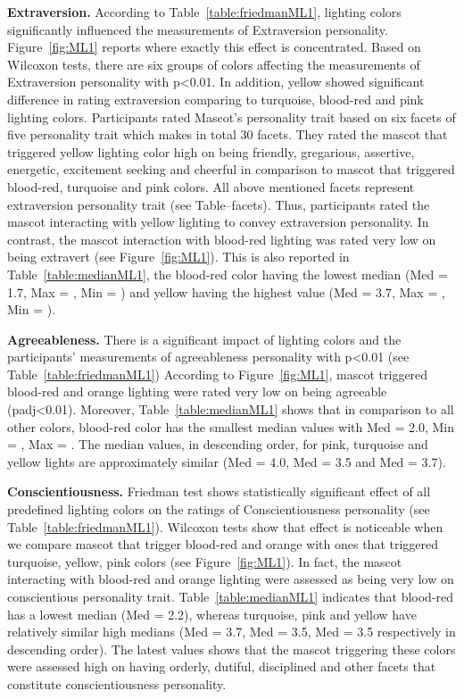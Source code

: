 \par\textbf{Extraversion.}
According to Table~\ref{table:friedmanML1}, lighting colors significantly
influenced the measurements of Extraversion personality.
Figure~\ref{fig:ML1} reports where exactly this effect is concentrated.
Based on Wilcoxon tests, there are six groups of colors affecting the
measurements of Extraversion personality with p<0.01.
In addition, yellow showed significant difference in rating extraversion
comparing to turquoise, blood-red and pink lighting colors.
Participants rated Mascot's personality trait based on six facets of five
personality trait which makes in total 30 facets.
They rated the mascot that triggered yellow lighting color high on being
friendly, gregarious, assertive, energetic, excitement seeking and
cheerful in comparison to mascot that triggered blood-red, turquoise and pink colors.
All above mentioned facets represent extraversion personality trait (see Table--facets).
Thus, participants rated the mascot interacting with yellow lighting to convey extraversion personality.
In contrast, the mascot interaction with blood-red lighting was
rated very low on being extravert (see Figure~\ref{fig:ML1}).
This is also reported in Table~\ref{table:medianML1}, the blood-red color having
the lowest median (Med = 1.7, Max = , Min = ) and yellow having the highest
value (Med = 3.7, Max = , Min = ).

\par\textbf{Agreeableness.}
There is a significant impact of lighting colors and the participants'
measurements of agreeableness personality with p<0.01 (see Table~\ref{table:friedmanML1})
According to Figure~\ref{fig:ML1}, mascot triggered blood-red and orange lighting
were rated very low on being agreeable (padj<0.01).
Moreover, Table~\ref{table:medianML1} shows that in comparison to all other colors,
blood-red color has the smallest median values with Med = 2.0, Min = , Max = .
The median values, in descending order, for pink, turquoise and yellow lights are
approximately similar (Med = 4.0, Med = 3.5 and Med = 3.7).

\par\textbf{Conscientiousness.}
Friedman test shows statistically significant effect of all predefined lighting colors
on the ratings of Conscientiousness personality (see Table~\ref{table:friedmanML1}).
Wilcoxon tests show that effect is noticeable when we compare mascot that trigger
blood-red and orange with ones that triggered turquoise, yellow, pink colors (see Figure~\ref{fig:ML1}).
In fact, the mascot interacting with blood-red and orange lighting were assessed
as being very low on conscientious personality trait.
Table~\ref{table:medianML1} indicates that blood-red has a lowest median (Med = 2.2), whereas turquoise, pink and
yellow have relatively similar high medians (Med = 3.7, Med = 3.5, Med = 3.5 respectively in descending order).
The latest values shows that the mascot triggering these colors were assessed high on having
orderly, dutiful, disciplined and other facets that constitute conscientiousness personality.

